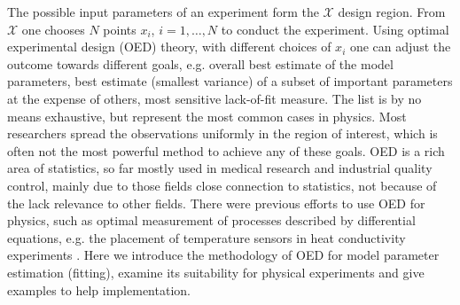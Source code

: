 \documentclass[12pt]{iopart}
\begin{document}
The possible input parameters of an experiment form the $\mathcal{X}$ design region. From $\mathcal{X}$ one chooses $N$ points $x_i$, $i = 1, \ldots, N$ to conduct the experiment. Using optimal experimental design (OED) theory, with different choices of $x_i$ one can adjust the outcome towards different goals, e.g. overall best estimate of the model parameters, best estimate (smallest variance) of a subset of important parameters at the expense of others, most sensitive lack-of-fit measure. The list is by no means exhaustive, but represent the most common cases in physics. Most researchers spread the observations uniformly in the region of interest, which is often not the most powerful method to achieve any of these goals. OED is a rich area of statistics, so far mostly used in medical research and industrial quality control, mainly due to those fields close connection to statistics, not because of the lack relevance to other fields. There were previous efforts to use OED for physics, such as optimal measurement of processes described by differential equations, e.g. the placement of temperature sensors in heat conductivity experiments \cite{Emery1998}. Here we introduce the methodology of OED for model parameter estimation (fitting), examine its suitability for physical experiments and give examples to help implementation.
\end{document}
